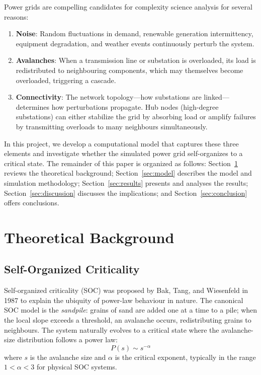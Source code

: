\documentclass[12pt,a4paper]{article}
\begin{document}
Power grids are compelling candidates for complexity science analysis for several reasons:

\begin{enumerate}[leftmargin=2em]
  \item \textbf{Noise}: Random fluctuations in demand, renewable generation intermittency, equipment degradation, and weather events continuously perturb the system.
  \item \textbf{Avalanches}: When a transmission line or substation is overloaded, its load is redistributed to neighbouring components, which may themselves become overloaded, triggering a cascade.
  \item \textbf{Connectivity}: The network topology---how substations are linked---determines how perturbations propagate. Hub nodes (high-degree substations) can either stabilize the grid by absorbing load or amplify failures by transmitting overloads to many neighbours simultaneously.
\end{enumerate}

In this project, we develop a computational model that captures these three elements and investigate whether the simulated power grid self-organizes to a critical state.
The remainder of this paper is organized as follows: Section~\ref{sec:background} reviews the theoretical background; Section~\ref{sec:model} describes the model and simulation methodology; Section~\ref{sec:results} presents and analyses the results; Section~\ref{sec:discussion} discusses the implications; and Section~\ref{sec:conclusion} offers conclusions.


\section{Theoretical Background}
\label{sec:background}

\subsection{Self-Organized Criticality}

Self-organized criticality (SOC) was proposed by Bak, Tang, and Wiesenfeld in 1987 \cite{bak1987} to explain the ubiquity of power-law behaviour in nature.
The canonical SOC model is the \textit{sandpile}: grains of sand are added one at a time to a pile; when the local slope exceeds a threshold, an avalanche occurs, redistributing grains to neighbours.
The system naturally evolves to a critical state where the avalanche-size distribution follows a power law:
\begin{equation}
  P(s) \sim s^{-\alpha}
  \label{eq:powerlaw}
\end{equation}
where $s$ is the avalanche size and $\alpha$ is the critical exponent, typically in the range $1 < \alpha < 3$ for physical SOC systems.
\end{document}
